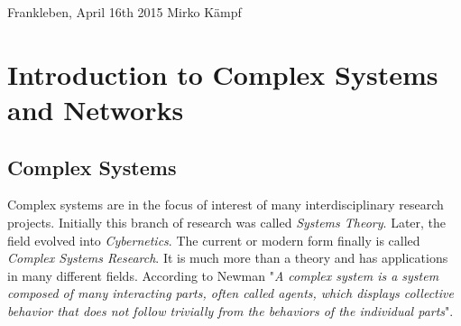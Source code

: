 \documentclass[a4paper,10pt]{scrbook}
\begin{document}



Frankleben, April 16th 2015
Mirko Kämpf









\newpage
{}


\part{Introduction to Complex Systems and Networks}


\chapter{Complex Systems}
Complex systems are in the focus of interest of many interdisciplinary research projects. Initially this branch of research was called \textit{Systems Theory}. Later, the field evolved into \textit{Cybernetics}. The current or modern form finally is called \textit{Complex Systems Research}. It is much more than a theory  and has applications in many different fields. According to Newman \cite{Newman2011} "\textit{A complex system is a system composed of many interacting parts, often called agents, which displays collective behavior that does not follow trivially from the behaviors of the individual parts}".
\end{document}
